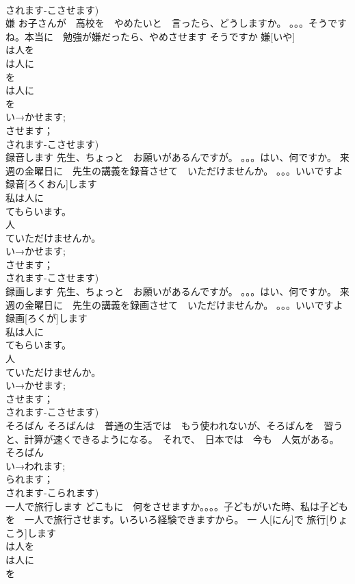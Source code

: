 \documentclass[8pt]{extreport}
\begin{document}
\begin{CJK}{UTF8}{min}
\\	されます-こさせます)
\\	嫌	お子さんが　高校を　やめたいと　言ったら、どうしますか。 。。。そうですね。本当に　勉強が嫌だったら、やめさせます そうですか	嫌[いや]			
\\	は人を
\\	は人に
\\	を
\\	は人に
\\	を
\\	い→かせます;
\\	させます；
\\	されます-こさせます)
\\	録音します	先生、ちょっと　お願いがあるんですが。 。。。はい、何ですか。 来週の金曜日に　先生の講義を録音させて　いただけませんか。 。。。いいですよ	録音[ろくおん]します			
\\	私は人に
\\	てもらいます。
\\	人
\\	ていただけませんか。
\\	い→かせます;
\\	させます；
\\	されます-こさせます)
\\	録画します	先生、ちょっと　お願いがあるんですが。 。。。はい、何ですか。 来週の金曜日に　先生の講義を録画させて　いただけませんか。 。。。いいですよ	録画[ろくが]します			
\\	私は人に
\\	てもらいます。
\\	人
\\	ていただけませんか。
\\	い→かせます;
\\	させます；
\\	されます-こさせます)
\\	そろばん	そろばんは　普通の生活では　もう使われないが、そろばんを　習うと、計算が速くできるようになる。　それで、　日本では　今も　人気がある。	そろばん			
\\	い→われます;
\\	られます；
\\	されます-こられます)
\\	一人で旅行します	どこもに　何をさせますか。。。。子どもがいた時、私は子どもを　一人で旅行させます。いろいろ経験できますから。	一 人[にん]で 旅行[りょこう]します			
\\	は人を
\\	は人に
\\	を

\end{CJK}
\end{document}
